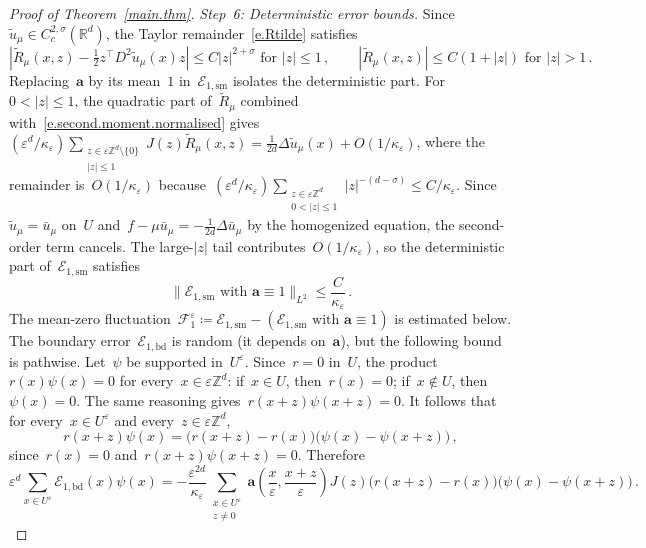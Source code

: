\documentclass[11pt]{amsart}
\theoremstyle{plain}
\theoremstyle{definition}
\theoremstyle{remark}
\newcommand{\Zd}{\mathbb{Z}^d}
\newcommand{\Rd}{\mathbb{R}^d}
\renewcommand{\a}{\mathbf{a}}
\newcommand{\eps}{\varepsilon}
\begin{document}
\begin{proof}[Proof of Theorem~\ref{main.thm}]
		\emph{Step~6: Deterministic error bounds.}
		Since~$\widetilde u_\mu \in C^{2,\sigma}_c(\Rd)$, the Taylor remainder~\eqref{e.Rtilde} satisfies
		\begin{equation}
			\label{e.Rtilde.bounds}
			\left|\widetilde R_\mu(x,z) - \tfrac{1}{2} z^\top D^2\widetilde u_\mu(x) z\right| \le C|z|^{2+\sigma} \text{ for } |z| \le 1\,,
			\qquad
			|\widetilde R_\mu(x,z)| \le C(1{+}|z|) \text{ for } |z| > 1\,.
		\end{equation}
		Replacing~$\a$ by its mean~$1$ in~$\mathcal{E}_{1,\mathrm{sm}}$ isolates the deterministic part.
		For~$0 < |z| \le 1$, the quadratic part of~$\widetilde R_\mu$ combined with~\eqref{e.second.moment.normalised} gives~$(\eps^d/\kappa_\eps)\sum_{\substack{z \in \eps\Zd \setminus \{0\} \\ |z| \le 1}} J(z) \widetilde R_\mu(x,z) = \frac{1}{2d}\Delta\widetilde u_\mu(x) + O(1/\kappa_\eps)$, where the remainder is~$O(1/\kappa_\eps)$ because~$(\eps^d/\kappa_\eps)\sum_{\substack{z \in \eps\Zd \\ 0 < |z| \le 1}}|z|^{-(d-\sigma)} \le C/\kappa_\eps$.
		Since~$\widetilde u_\mu = \bar u_\mu$ on~$U$ and~$f - \mu\bar u_\mu = -\frac{1}{2d}\Delta\bar u_\mu$ by the homogenized equation, the second-order term cancels.
		The large-$|z|$ tail contributes~$O(1/\kappa_\eps)$, so the deterministic part of~$\mathcal{E}_{1,\mathrm{sm}}$ satisfies
		\begin{equation}
			\label{e.B1.bound}
			\|\mathcal{E}_{1,\mathrm{sm}} \text{ with } \a \equiv 1\|_{L^2} \le \frac{C}{\kappa_\eps}\,.
		\end{equation}
		The mean-zero fluctuation~$\mathcal{F}_1^\eps \coloneqq \mathcal{E}_{1,\mathrm{sm}} - (\mathcal{E}_{1,\mathrm{sm}} \text{ with } \a \equiv 1)$ is estimated below.
		The boundary error~$\mathcal{E}_{1,\mathrm{bd}}$ is random (it depends on~$\a$), but the following bound is pathwise.
		Let~$\psi$ be supported in~$U^\eps$.
		Since~$r = 0$ in~$U$, the product~$r(x)\psi(x) = 0$ for every~$x \in \eps\Zd$: if~$x \in U$, then~$r(x) = 0$; if~$x \notin U$, then~$\psi(x) = 0$.
		The same reasoning gives~$r(x{+}z)\psi(x{+}z) = 0$.
		It follows that for every~$x \in U^\eps$ and every~$z \in \eps\Zd$,
		\[
		r(x{+}z)\psi(x) = \bigl(r(x{+}z) - r(x)\bigr)\bigl(\psi(x) - \psi(x{+}z)\bigr)\,,
		\]
		since~$r(x) = 0$ and~$r(x{+}z)\psi(x{+}z) = 0$.
		Therefore
		\[
		\eps^d \sum_{x \in U^\eps} \mathcal{E}_{1,\mathrm{bd}}(x)\psi(x)
		= -\frac{\eps^{2d}}{\kappa_\eps}\sum_{\substack{x \in U^\eps \\ z \ne 0}} \a\left(\frac{x}{\eps},\frac{x{+}z}{\eps}\right) J(z)\bigl(r(x{+}z) - r(x)\bigr)\bigl(\psi(x) - \psi(x{+}z)\bigr)\,.
\]
\end{proof}
\end{document}
